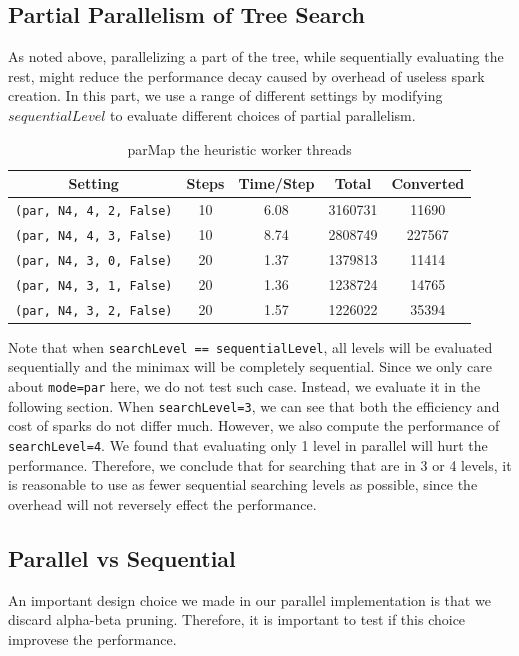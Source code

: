 \documentclass[twoside,11pt]{homework}
\begin{document}
\subsection{Partial Parallelism of Tree Search}
As noted above, parallelizing a part of the tree, while sequentially evaluating the rest, might reduce the performance decay caused by overhead of useless spark creation. In this part, we use a range of different settings by modifying $sequentialLevel$ to evaluate different choices of partial parallelism.

\begin{table}[h!]
\centering
\begin{tabular}{||c c c c c||} 
 \hline
 Setting & Steps & Time/Step & Total & Converted \\ [0.5ex] 
 \hline\hline
 \texttt{(par, N4, 4, 2, False)} & 10 & 6.08 & 3160731 & 11690 \\ 
 \texttt{(par, N4, 4, 3, False)} & 10 & 8.74 & 2808749 & 227567 \\ 
 \texttt{(par, N4, 3, 0, False)} & 20 & 1.37 & 1379813 & 11414 \\
 \texttt{(par, N4, 3, 1, False)} & 20 & 1.36 & 1238724 & 14765 \\
 \texttt{(par, N4, 3, 2, False)} & 20 & 1.57 & 1226022 & 35394 \\ [1ex] 
 \hline
\end{tabular}
\caption{parMap the heuristic worker threads}
\label{parMap-heuristic-workers}
\end{table}

Note that when \texttt{searchLevel == sequentialLevel}, all levels will be evaluated sequentially and the minimax will be completely sequential. Since we only care about \texttt{mode=par} here, we do not test such case. Instead, we evaluate it in the following section. When \texttt{searchLevel=3}, we can see that both the efficiency and cost of sparks do not differ much. However, we also compute the performance of \texttt{searchLevel=4}. We found that evaluating only 1 level in parallel will hurt the performance. Therefore, we conclude that for searching that are in 3 or 4 levels, it is reasonable to use as fewer sequential searching levels as possible, since the overhead will not reversely effect the performance.

\subsection{Parallel vs Sequential}
An important design choice we made in our parallel implementation is that we discard alpha-beta pruning. Therefore, it is important to test if this choice improvese the performance.
\end{document}
